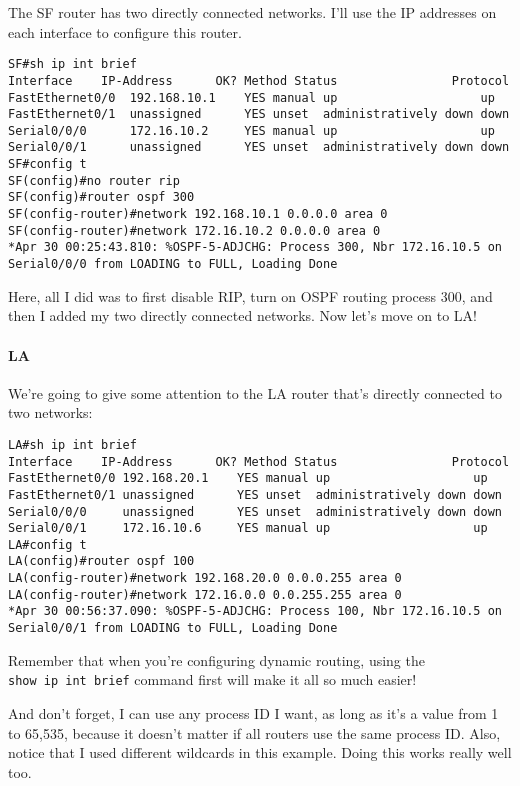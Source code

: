 The SF router has two directly connected networks. I'll use the IP
addresses on each interface to configure this router.

\begin{verbatim}
SF#sh ip int brief
Interface    IP-Address      OK? Method Status                Protocol
FastEthernet0/0  192.168.10.1    YES manual up                    up
FastEthernet0/1  unassigned      YES unset  administratively down down
Serial0/0/0      172.16.10.2     YES manual up                    up
Serial0/0/1      unassigned      YES unset  administratively down down
SF#config t
SF(config)#no router rip
SF(config)#router ospf 300
SF(config-router)#network 192.168.10.1 0.0.0.0 area 0
SF(config-router)#network 172.16.10.2 0.0.0.0 area 0
*Apr 30 00:25:43.810: %OSPF-5-ADJCHG: Process 300, Nbr 172.16.10.5 on Serial0/0/0 from LOADING to FULL, Loading Done
\end{verbatim}

Here, all I did was to first disable RIP, turn on OSPF routing process
300, and then I added my two directly connected networks. Now let's move
on to LA!

\paragraph{LA}

We're going to give some attention to the LA router that's directly
connected to two networks:

\begin{verbatim}
LA#sh ip int brief
Interface    IP-Address      OK? Method Status                Protocol
FastEthernet0/0 192.168.20.1    YES manual up                    up
FastEthernet0/1 unassigned      YES unset  administratively down down
Serial0/0/0     unassigned      YES unset  administratively down down
Serial0/0/1     172.16.10.6     YES manual up                    up
LA#config t
LA(config)#router ospf 100
LA(config-router)#network 192.168.20.0 0.0.0.255 area 0
LA(config-router)#network 172.16.0.0 0.0.255.255 area 0
*Apr 30 00:56:37.090: %OSPF-5-ADJCHG: Process 100, Nbr 172.16.10.5 on Serial0/0/1 from LOADING to FULL, Loading Done
\end{verbatim}

Remember that when you're configuring dynamic routing, using the
\texttt{show\ ip\ int\ brief} command first will make it all so much
easier!

And don't forget, I can use any process ID I want, as long as it's a
value from 1 to 65,535, because it doesn't matter if all routers use the
same process ID. Also, notice that I used different wildcards in this
example. Doing this works really well too.


